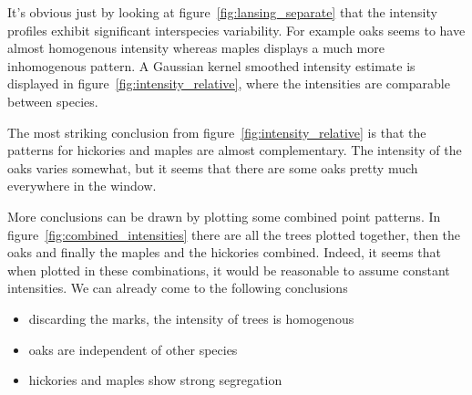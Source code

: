 \documentclass[12pt,a4paper,oneside,article]{memoir}
\begin{document}
It's obvious just by looking at figure~\ref{fig:lansing_separate} that 
the intensity profiles exhibit significant interspecies variability. For example
oaks seems to have almost homogenous intensity whereas maples
displays a much more inhomogenous pattern. A Gaussian kernel smoothed intensity 
estimate is displayed in figure~\ref{fig:intensity_relative}, where
the intensities are comparable between species. 

The most striking conclusion from figure~\ref{fig:intensity_relative} is that
the patterns for hickories and maples are almost complementary. The intensity
of the oaks varies somewhat, but it seems that there are some oaks pretty
much everywhere in the window.

More conclusions can be drawn by plotting some combined point patterns. In 
figure~\ref{fig:combined_intensities} there are all the trees plotted together, then
the oaks and finally the maples and the hickories combined. Indeed, it seems
that when plotted in these combinations, it would be reasonable to assume
constant intensities. We can already come to the following
conclusions
\begin{itemize}
  \item discarding the marks, the intensity of trees is homogenous
  \item oaks are independent of other species
  \item hickories and maples show strong segregation
\end{itemize}
\end{document}
